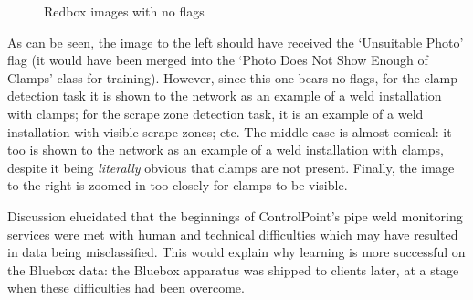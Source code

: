 \documentclass[a4paper,11pt]{article}
\begin{document}
\begin{figure}[h]
    \caption{Redbox images with no flags}
    \label{materialflowChart}
\end{figure}

As can be seen, the image to the left should have received the `Unsuitable Photo' flag (it would have been merged into the `Photo Does Not Show Enough of Clamps' class for training). However, since this one bears no flags, for the clamp detection task it is shown to the network as an example of a weld installation with clamps; for the scrape zone detection task, it is an example of a weld installation with visible scrape zones; etc. The middle case is almost comical: it too is shown to the network as an example of a weld installation with clamps, despite it being \textit{literally} obvious that clamps are not present. Finally, the image to the right is zoomed in too closely for clamps to be visible. 

Discussion elucidated that the beginnings of ControlPoint's pipe weld monitoring services were met with human and technical difficulties which may have resulted in data being misclassified. This would explain why learning is more successful on the Bluebox data: the Bluebox apparatus was shipped to clients later, at a stage when these difficulties had been overcome.
\end{document}
